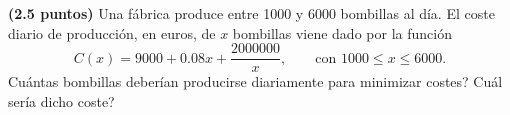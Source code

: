 
\textbf{(2.5 puntos)} Una fábrica produce entre 1000 y 6000 bombillas al día. El coste diario de producción, en euros, de $x$ bombillas viene dado por la función
\[
C(x)=9000+0.08x+\frac{2000000}{x},\qquad\text{con }1000\leq x\leq 6000.
\]
\textquestiondown{}Cuántas bombillas deberían producirse diariamente para minimizar costes? \textquestiondown{}Cuál sería dicho coste?
